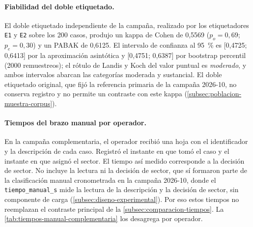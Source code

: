 \paragraph{Fiabilidad del doble etiquetado.} El doble etiquetado independiente de la campaña, realizado por los etiquetadores \texttt{E1} y \texttt{E2} sobre los 200 casos, produjo un kappa de Cohen de 0,5569 ($p_o = 0,69$; $p_e = 0,30$) y un PABAK de 0,6125. El intervalo de confianza al 95~\% es [0,4725; 0,6413] por la aproximación asintótica \parencite{Fleiss1969_large_sample} y [0,4751; 0,6387] por bootstrap percentil (2000 remuestreos); el rótulo de Landis y Koch del valor puntual es \emph{moderado}, y ambos intervalos abarcan las categorías moderada y sustancial. El doble etiquetado original, que fijó la referencia primaria de la campaña 2026-10, no conserva registro y no permite un contraste con este kappa (\autoref{subsec:poblacion-muestra-corpus}).

\paragraph{Tiempos del brazo manual por operador.} En la campaña complementaria, el operador recibió una hoja con el identificador y la descripción de cada caso. Registró el instante en que tomó el caso y el instante en que asignó el sector. El tiempo así medido corresponde a la decisión de sector. No incluye la lectura ni la decisión de sector, que sí formaron parte de la clasificación manual cronometrada en la campaña 2026-10, donde el \texttt{tiempo\_manual\_s} mide la lectura de la descripción y la decisión de sector, sin componente de carga (\autoref{subsec:diseno-experimental}). Por eso estos tiempos no reemplazan el contraste principal de la \autoref{subsec:comparacion-tiempos}. La \autoref{tab:tiempos-manual-complementaria} los desagrega por operador.

